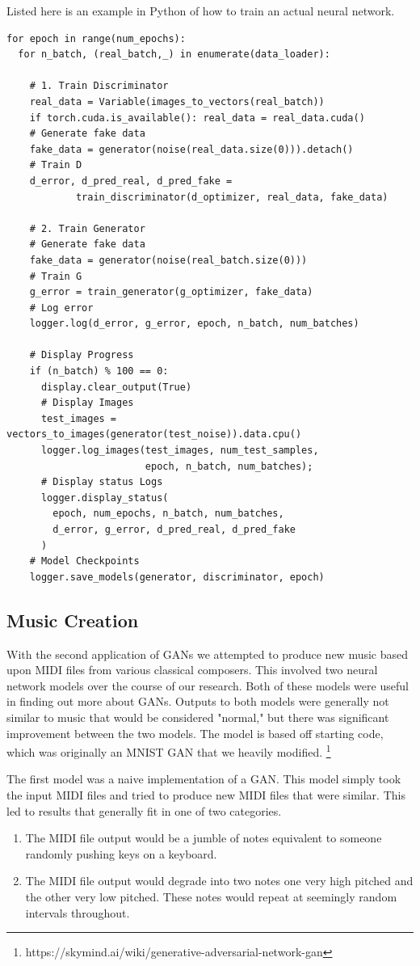 \documentclass[12pt]{amsart}
\theoremstyle{definition}
\theoremstyle{remark}
\begin{document}
Listed here is an example in Python of how to train an actual neural network.

\small{
\begin{lstlisting}
for epoch in range(num_epochs):
  for n_batch, (real_batch,_) in enumerate(data_loader):

    # 1. Train Discriminator
    real_data = Variable(images_to_vectors(real_batch))
    if torch.cuda.is_available(): real_data = real_data.cuda()
    # Generate fake data
    fake_data = generator(noise(real_data.size(0))).detach()
    # Train D
    d_error, d_pred_real, d_pred_fake = 
            train_discriminator(d_optimizer, real_data, fake_data)

    # 2. Train Generator
    # Generate fake data
    fake_data = generator(noise(real_batch.size(0)))
    # Train G
    g_error = train_generator(g_optimizer, fake_data)
    # Log error
    logger.log(d_error, g_error, epoch, n_batch, num_batches)

    # Display Progress
    if (n_batch) % 100 == 0:
      display.clear_output(True)
      # Display Images
      test_images = vectors_to_images(generator(test_noise)).data.cpu()
      logger.log_images(test_images, num_test_samples,
                        epoch, n_batch, num_batches);
      # Display status Logs
      logger.display_status(
        epoch, num_epochs, n_batch, num_batches,
        d_error, g_error, d_pred_real, d_pred_fake
      )
    # Model Checkpoints
    logger.save_models(generator, discriminator, epoch)
\end{lstlisting}
}

\subsection{Music Creation}
With the second application of GANs we attempted to produce new music based upon 
MIDI files from various classical composers. This involved two neural network models
over the course of our research. Both of these models were useful in finding out more about GANs.
Outputs to both models were generally not similar to music that would be considered "normal,"
but there was significant improvement between the two models. The model is based off starting code, 
which was originally an MNIST GAN that we heavily modified.
\footnote{https://skymind.ai/wiki/generative-adversarial-network-gan}

The first model was a naive implementation of a GAN. This model simply took the
input MIDI files and tried to produce new MIDI files that were similar. This led to results that generally fit in one
of two categories.
\begin{enumerate}
    \item The MIDI file output would be a jumble of notes equivalent to someone randomly pushing 
        keys on a keyboard.
    \item The MIDI file output would degrade into two notes one very high pitched and the other very low
        pitched. These notes would repeat at seemingly random intervals throughout.
\end{enumerate}
\end{document}
